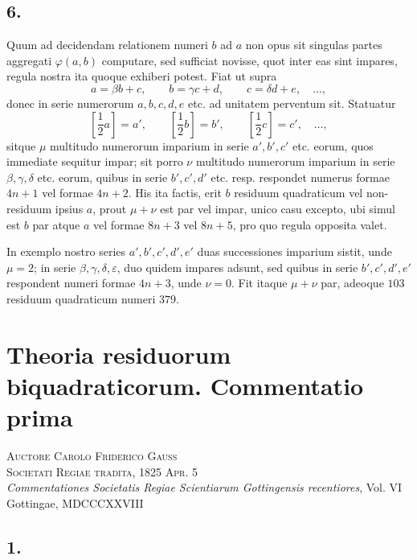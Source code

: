 \documentclass[12pt]{article}
\begin{document}
\subsection*{6.}

Quum ad decidendam relationem numeri $b$ ad $a$ non opus sit singulas partes aggregati $\varphi(a,b)$ computare, sed sufficiat novisse, quot inter eas sint impares, regula nostra ita quoque exhiberi potest. Fiat ut supra
\[
a=\beta b+c,\qquad b=\gamma c+d,\qquad c=\delta d+e,\quad\ldots,
\]
donec in serie numerorum $a,b,c,d,e$ etc. ad unitatem perventum sit. Statuatur
\[
\left[\frac12a\right]=a',\qquad \left[\frac12b\right]=b',\qquad \left[\frac12c\right]=c',\quad\ldots,
\]
sitque $\mu$ multitudo numerorum imparium in serie $a',b',c'$ etc. eorum, quos immediate sequitur impar; sit porro $\nu$ multitudo numerorum imparium in serie $\beta,\gamma,\delta$ etc. eorum, quibus in serie $b',c',d'$ etc. resp. respondet numerus formae $4n+1$ vel formae $4n+2$. His ita factis, erit $b$ residuum quadraticum vel non-residuum ipsius $a$, prout $\mu+\nu$ est par vel impar, unico casu excepto, ubi simul est $b$ par atque $a$ vel formae $8n+3$ vel $8n+5$, pro quo regula opposita valet.

In exemplo nostro series $a',b',c',d',e'$ duas successiones imparium sistit, unde $\mu=2$; in serie $\beta,\gamma,\delta,\varepsilon$, duo quidem impares adsunt, sed quibus in serie $b',c',d',e'$ respondent numeri formae $4n+3$, unde $\nu=0$. Fit itaque $\mu+\nu$ par, adeoque $103$ residuum quadraticum numeri $379$.



\section*{Theoria residuorum biquadraticorum. Commentatio prima}

\begin{center}
\textsc{Auctore Carolo Friderico Gauss}\\
\textsc{Societati Regiae tradita, 1825 Apr. 5}\\[3pt]
\emph{Commentationes Societatis Regiae Scientiarum Gottingensis recentiores}, Vol. VI\\
Gottingae, MDCCCXXVIII
\end{center}

\subsection*{1.}
\end{document}
